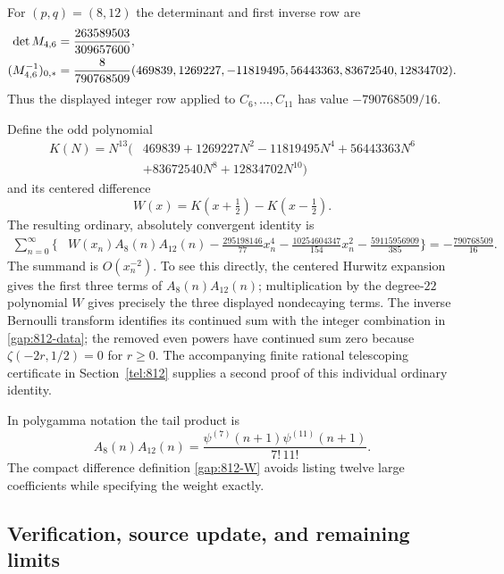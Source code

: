 For $(p,q)=(8,12)$ the determinant and first inverse row are
\begin{align}\label{gap:812-data}
 \det M_{4,6}&=\frac{263589503}{309657600},\notag\\
 (M_{4,6}^{-1})_{0,*}
 &=\frac8{790768509}
 (469839,1269227,-11819495,56443363,83672540,12834702).
\end{align}
Thus the displayed integer row applied to $C_6,\ldots,C_{11}$
has value $-790768509/16$.

Define the odd polynomial
\begin{equation}\label{gap:812-K}
 \begin{split}
 K(N)=N^{13}\bigl(&469839+1269227N^2-11819495N^4
                   +56443363N^6\\
                 &+83672540N^8+12834702N^{10}\bigr)
 \end{split}
\end{equation}
and its centered difference
\begin{equation}\label{gap:812-W}
 W(x)=K(x+\tfrac12)-K(x-\tfrac12).
\end{equation}
The resulting ordinary, absolutely convergent identity is
\begin{equation}\label{gap:812-ordinary}
 \begin{split}
 \sum_{n=0}^{\infty}\biggl\{&W(x_n)A_8(n)A_{12}(n)
       -\frac{295198146}{77}x_n^4
       -\frac{10254604347}{154}x_n^2
       -\frac{59115956909}{385}\biggr\}
 =-\frac{790768509}{16}.
 \end{split}
\end{equation}
The summand is $O(x_n^{-2})$. To see this directly, the centered
Hurwitz expansion gives the first three terms of $A_8(n)A_{12}(n)$;
multiplication by the degree-$22$ polynomial $W$ gives precisely
the three displayed nondecaying terms. The inverse Bernoulli
transform identifies its continued sum with the integer combination
in \eqref{gap:812-data}; the removed even powers have continued
sum zero because $\zeta(-2r,1/2)=0$ for $r\ge0$. The accompanying
finite rational telescoping certificate in Section~\ref{tel:812}
supplies a second proof of this individual ordinary identity.

In polygamma notation the tail product is
\[
 A_8(n)A_{12}(n)
   =\frac{\psi^{(7)}(n+1)\psi^{(11)}(n+1)}{7!\,11!}.
\]
The compact difference definition \eqref{gap:812-W} avoids listing
twelve large coefficients while specifying the weight exactly.

\subsection{Verification, source update, and remaining limits}

